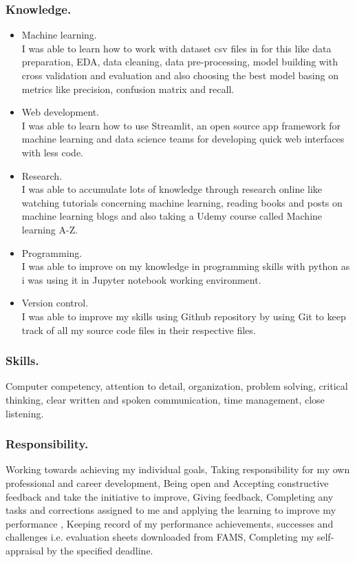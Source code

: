 \documentclass[11pt]{article}
\begin{document}
\subsubsection{Knowledge.}
\begin{itemize}
	\item Machine learning.\\
	I was able to learn how to work with dataset csv files in for this like data preparation, EDA, data cleaning, data pre-processing, model building with cross validation and evaluation and also choosing the best model basing on metrics like precision, confusion matrix and recall.\\
	
	\item Web development.\\
	I was able to learn how to use Streamlit, an open source app framework for machine learning and data science teams for developing quick web interfaces with less code. 
	
	\item Research.\\
	I was able to accumulate lots of knowledge through research online like watching tutorials concerning machine learning, reading books and posts on machine learning blogs and also taking a Udemy course called Machine learning A-Z.
	
	\item Programming.\\
	I was able to improve on my knowledge in programming skills with python as i was using it in Jupyter notebook working environment.
	
	\item Version control.\\
	I was able to improve my skills using Github repository by using Git to keep track of all my source code files in their respective files.\\
	
\end{itemize}

\subsubsection{Skills.}
Computer competency, attention to detail, organization, problem solving, critical thinking, clear
written and spoken communication, time management, close listening.\\

\subsubsection{Responsibility.}
Working towards achieving my individual goals, Taking responsibility for my own professional and career development, Being open
and Accepting constructive feedback and take the initiative to improve, Giving feedback,
Completing any tasks and corrections assigned to me and applying the learning to improve my
performance , Keeping record of my performance achievements, successes and challenges i.e.
evaluation sheets downloaded from FAMS, Completing my self-appraisal by the specified deadline.
\end{document}
